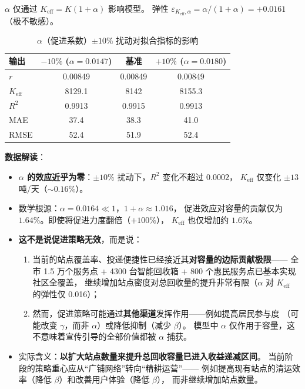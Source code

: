 \documentclass[12pt,a4paper]{ctexart}
\begin{document}
\begin{table}[htbp]
$\alpha$ 仅通过 $K_{\text{eff}} = K(1+\alpha)$ 影响模型。
弹性 $\varepsilon_{K_{\text{eff}},\alpha} = \alpha/(1+\alpha) = +0.0161$（极不敏感）。

\begin{table}[htbp]
\centering
\caption{$\alpha$（促进系数）$\pm 10\%$ 扰动对拟合指标的影响}
\label{tab:sens_alpha}
\begin{tabular}{lccc}
\toprule
输出 & $-10\%$ ($\alpha = 0.0147$) & 基准 & $+10\%$ ($\alpha = 0.0180$) \\
\midrule
$r$      & 0.00849 & 0.00849 & 0.00849 \\
$K_{\text{eff}}$ & 8129.1 & 8142 & 8155.3 \\
$R^2$    & 0.9913 & 0.9915 & 0.9913 \\
MAE      & 37.4 & 38.3 & 41.0 \\
RMSE     & 52.4 & 51.9 & 52.4 \\
\bottomrule
\end{tabular}
\end{table}

\textbf{数据解读}：
\begin{itemize}
  \item \textbf{$\alpha$ 的效应近乎为零}：$\pm 10\%$ 扰动下，$R^2$ 变化不超过 $0.0002$，
        $K_{\text{eff}}$ 仅变化 $\pm 13$ 吨/天（$\sim 0.16\%$）。
  \item 数学根源：$\alpha = 0.0164 \ll 1$，$1+\alpha \approx 1.016$，
        促进效应对容量的贡献仅为 $1.64\%$。即使将促进力度翻倍（$+100\%$），
        $K_{\text{eff}}$ 也仅增加约 $1.6\%$。
  \item \textbf{这不是说促进策略无效}，而是说：
        \begin{enumerate}
          \item 当前的站点覆盖率、投递便捷性已经接近其\textbf{对容量的边际贡献极限}——
                全市 1.5 万个服务点 + 4300 台智能回收箱 + 800 个惠民服务点已基本实现社区全覆盖，
                继续增加站点密度对总回收量的提升非常有限（$\alpha$ 对 $K_{\text{eff}}$ 的弹性仅 0.016）；
          \item 然而，促进策略可能通过\textbf{其他渠道}发挥作用——例如提高居民参与度
                （可能改变 $\gamma$，而非 $\alpha$）或降低抑制（减少 $\beta$）。
                模型中 $\alpha$ 仅作用于容量，这不意味着宣传引导的全部价值都被 $\alpha$ 捕获。
        \end{enumerate}
  \item 实际含义：\textbf{以扩大站点数量来提升总回收容量已进入收益递减区间}。
        当前阶段的策略重心应从``广铺网络''转向``精耕运营''——
        例如提高现有站点的清运效率（降低 $\beta$）和改善用户体验（降低 $\beta$），
        而非继续增加站点数量。
\end{itemize}


\end{table}
\end{document}
